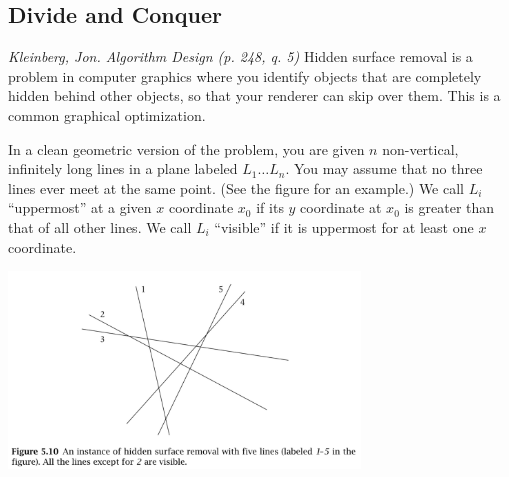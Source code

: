 \documentclass[solutionorbox, answers]{exam}
\begin{document}
\begin{center}
\end{center}
\vspace{0.1in}
 \qquad
{}

\begin{questions}

\section*{Divide and Conquer}

\question
\emph{Kleinberg, Jon. Algorithm Design (p. 248, q. 5)} Hidden surface removal is a problem in computer graphics where you identify objects that are completely hidden behind other objects, so that your renderer can skip over them. This is a common graphical optimization.

In a clean geometric version of the problem, you are given $n$ non-vertical, infinitely long lines in a plane labeled $L_1\ldots L_n$. You may assume that no three lines ever meet at the same point. (See the figure for an example.) We call $L_i$ ``uppermost'' at a given $x$ coordinate $x_0$ if its $y$ coordinate at $x_0$ is greater than that of all other lines. We call $L_i$ ``visible'' if it is uppermost for at least one $x$ coordinate.

\vspace*{-2ex}
\begin{center}
\includegraphics[width=0.7\textwidth]{LineRemoval.png}
\end{center}

\vspace*{-20ex}
\hspace*{20ex}
\vspace*{5ex}


\end{questions}
\end{document}
